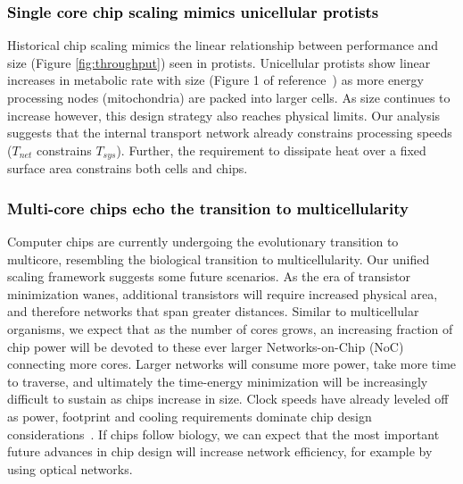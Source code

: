 \documentclass[12pt]{article}
\newcommand{\red}[1]{\textcolor{black}{#1}}
\begin{document}
\red {\subsubsection{Single core chip scaling mimics unicellular protists}} Historical chip scaling mimics the linear relationship between performance and
size (Figure \ref{fig:throughput}) seen in protists. Unicellular protists show linear increases
in metabolic rate with size (Figure 1 of reference~\cite{delong2010shifts}) as more energy processing nodes (mitochondria) are
packed into larger cells. As size continues to increase however, this
design strategy also reaches physical limits.  Our analysis suggests that the
internal transport network already constrains processing speeds
($T_{net}$ constrains $T_{sys}$). Further, the requirement to
dissipate heat over a fixed surface area constrains both cells and chips. 

\red{\subsubsection{Multi-core chips echo the transition to multicellularity}} Computer chips are currently undergoing
the evolutionary transition to multicore, resembling the biological
transition to multicellularity. Our unified scaling framework suggests
some future scenarios. As the era of transistor minimization wanes,
additional transistors will require increased physical area, and
therefore networks that span greater distances. Similar to
multicellular organisms, we expect that as the number of cores grows,
an increasing fraction of chip power will be devoted to these ever
larger Networks-on-Chip (NoC) connecting more cores. Larger networks
will consume more power, take more time to traverse, and ultimately
the time-energy minimization will be increasingly difficult to sustain
as chips increase in size.  Clock speeds have already leveled off as 
power, footprint and
cooling requirements 
dominate chip design
considerations~\cite{waldrop2016chips}.  If chips follow biology, we can expect
that the most important future advances in chip
design will increase network efficiency, for example by using optical
networks.
\end{document}
